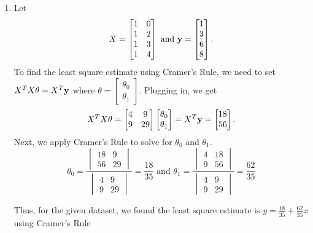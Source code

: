 \documentclass[12pt,letterpaper]{hmcpset}
\begin{document}
\begin{solution}
    \begin{enumerate}
    	\item Let $$X = \begin{bmatrix}
1 & 0 \\
1 & 2 \\
1 & 3 \\
1 & 4
\end{bmatrix}\text{ and } {\bf y} = \begin{bmatrix}
1 \\
3 \\
6 \\
8
\end{bmatrix}.$$
To find the least square estimate using Cramer's Rule, we need to set $X^TX \theta = X^T{\bf y}$ where $\theta = \begin{bmatrix}
	\theta_0\\
	\theta_1
\end{bmatrix}$. Plugging in, we get $$X^TX\theta = \begin{bmatrix}
	4 & 9\\
	9 & 29
\end{bmatrix}\begin{bmatrix}
	\theta_0\\
	\theta_1
\end{bmatrix} = X^T{\bf y} = \begin{bmatrix}
	18\\
	56
\end{bmatrix}.$$
Next, we apply Cramer's Rule to solve for $\theta_0$ and $\theta_1$. $$\theta_0 =\frac{
\begin{vmatrix}
18 & 9 \\
56 & 29
\end{vmatrix}
}{
\begin{vmatrix}
4 & 9 \\
9 & 29
\end{vmatrix}
} = \frac{18}{35} \text{ and }\theta_1 =\frac{
\begin{vmatrix}
4 & 18 \\
9 & 56
\end{vmatrix}
}{
\begin{vmatrix}4 & 9 \\
9 & 29
\end{vmatrix}
} = \frac{62}{35}$$

Thus, for the given dataset,  we found the least square estimate is $y = \frac{18}{35} +\frac{62}{35}x$ using Cramer's Rule


\end{enumerate}
\end{solution}
\end{document}
